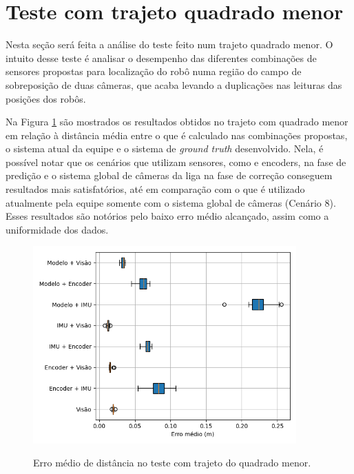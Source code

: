\documentclass[acronym, symbols, table, deposito]{fei}
\begin{document}
	\section{Teste com trajeto quadrado menor} \label{sec:resultados_quadrado_menor}
	
	Nesta seção será feita a análise do teste feito num trajeto quadrado menor. O intuito desse teste é analisar o desempenho das diferentes combinações de sensores propostas para localização do robô numa região do campo de sobreposição de duas câmeras, que acaba levando a duplicações nas leituras das posições dos robôs.
	
	Na Figura \ref{fig:erro_medio_distancia_quad_menor} são mostrados os resultados obtidos no trajeto com quadrado menor em relação à distância média entre o que é calculado nas combinações propostas, o sistema atual da equipe e o sistema de \textit{ground truth} desenvolvido. Nela, é possível notar que os cenários que utilizam sensores, como  e encoders, na fase de predição e o sistema global de câmeras da liga na fase de correção conseguem resultados mais satisfatórios, até em comparação com o que é utilizado atualmente pela equipe somente com o sistema global de câmeras (Cenário 8). Esses resultados são notórios pelo baixo erro médio alcançado, assim como a uniformidade dos dados.
	
	\begin{figure}[!htb]
		\centering
		\caption{Erro médio de distância no teste com trajeto do quadrado menor.}
		\includegraphics[width=0.9\textwidth]{../Dados/Graficos-Resultados/erro_medio_distancia_quadrado_menor.png}
		\label{fig:erro_medio_distancia_quad_menor}
	\end{figure}
\end{document}
